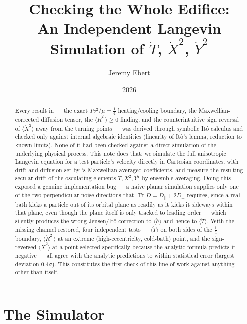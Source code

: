 \documentclass[12pt]{amsart}
\title[Independent Monte Carlo Validation]{Checking the Whole Edifice:\\
An Independent Langevin Simulation of $\dot T$, $\dot X^2$, $\dot Y^2$}
\author{Jeremy Ebert}
\date{2026}
\theoremstyle{plain}
\theoremstyle{remark}
\begin{document}
\maketitle

\begin{abstract}
Every result in \cite{Ebert2026Cancellation,Ebert2026Rest} --- the exact $Tv^2/\mu=\tfrac14$ heating/cooling boundary, the Maxwellian-corrected diffusion tensor, the $\langle\dot R_-^2\rangle\geq0$ finding, and the counterintuitive sign reversal of $\langle\dot X^2\rangle$ away from the turning points --- was derived through symbolic It\^o calculus and checked only against internal algebraic identities (linearity of It\^o's lemma, reduction to known limits). None of it had been checked against a direct simulation of the underlying physical process. This note does that: we simulate the full anisotropic Langevin equation for a test particle's velocity directly in Cartesian coordinates, with drift and diffusion set by \cite{Ebert2026Rosenbluth}'s Maxwellian-averaged coefficients, and measure the resulting secular drift of the osculating elements $T,X^2,Y^2$ by ensemble averaging. Doing this exposed a genuine implementation bug --- a naive planar simulation supplies only one of the two perpendicular noise directions that $\operatorname{Tr}D=D_\parallel+2D_\perp$ requires, since a real bath kicks a particle out of its orbital plane as readily as it kicks it sideways within that plane, even though the plane itself is only tracked to leading order --- which silently produces the wrong Jensen/It\^o correction to $\langle\dot h\rangle$ and hence to $\langle\dot T\rangle$. With the missing channel restored, four independent tests --- $\langle\dot T\rangle$ on both sides of the $\tfrac14$ boundary, $\langle\dot R_-^2\rangle$ at an extreme (high-eccentricity, cold-bath) point, and the sign-reversed $\langle\dot X^2\rangle$ at a point selected specifically because the analytic formula predicts it negative --- all agree with the analytic predictions to within statistical error (largest deviation $0.4\sigma$). This constitutes the first check of this line of work against anything other than itself.
\end{abstract}

\section{The Simulator}
\end{document}
